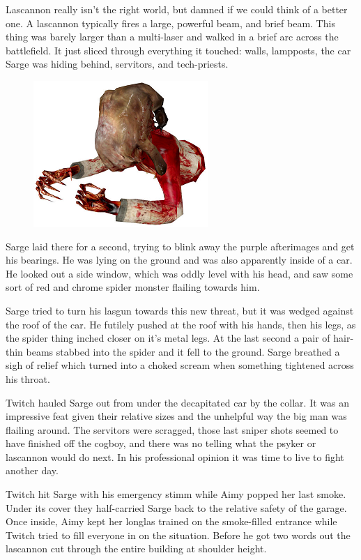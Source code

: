 Lascannon really isn't the right world, but damned if we could think of a better one. 
A lascannon typically fires a large, powerful beam, and brief beam. 
This thing was barely larger than a multi-laser and walked in a brief arc across the battlefield. 
It just sliced through everything it touched: 
walls, lampposts, the car Sarge was hiding behind, servitors, and tech-priests.

\begin{figure}
	\begin{center}
		\includegraphics[width=\figwidth]{pics/11/24.png}
	\end{center}
\end{figure}
Sarge laid there for a second, trying to blink away the purple afterimages and get his bearings. 
He was lying on the ground and was also apparently inside of a car. 
He looked out a side window, which was oddly level with his head, and saw some sort of red and chrome spider monster flailing towards him. 


Sarge tried to turn his lasgun towards this new threat, but it was wedged against the roof of the car. 
He futilely pushed at the roof with his hands, then his legs, as the spider thing inched closer on it's metal legs. 
At the last second a pair of hair-thin beams stabbed into the spider and it fell to the ground. 
Sarge breathed a sigh of relief which turned into a choked scream when something tightened across his throat.

Twitch hauled Sarge out from under the decapitated car by the collar. 
It was an impressive feat given their relative sizes and the unhelpful way the big man was flailing around. 
The servitors were scragged, those last sniper shots seemed to have finished off the cogboy, and there was no telling what the psyker or lascannon would do next. 
In his professional opinion it was time to live to fight another day.

Twitch hit Sarge with his emergency stimm while Aimy popped her last smoke. 
Under its cover they half-carried Sarge back to the relative safety of the garage. 
Once inside, Aimy kept her longlas trained on the smoke-filled entrance while Twitch tried to fill everyone in on the situation. 
Before he got two words out the lascannon cut through the entire building at shoulder height.

